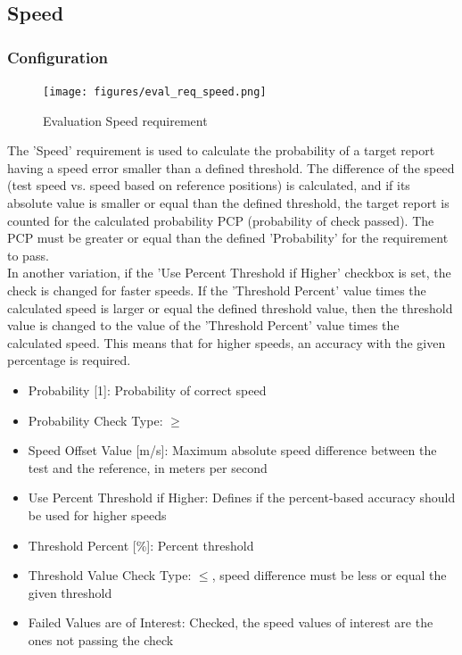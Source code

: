 \subsection{Speed}
\label{sec:eval_req_speed} 

\subsubsection{Configuration}

\begin{figure}[H]
    \texttt{[image: figures/eval\_req\_speed.png]}
  \caption{Evaluation Speed requirement}
\end{figure}

The 'Speed' requirement is used to calculate the probability of a target report having a speed error smaller than a defined threshold. The difference of the speed (test speed vs. speed based on reference positions) is calculated, and if its absolute value is smaller or equal than the defined threshold, the target report is counted for the calculated probability PCP (probability of check passed). The PCP must be greater or equal than the defined 'Probability' for the requirement to pass. \\

In another variation, if the 'Use Percent Threshold if Higher' checkbox is set, the check is changed for faster speeds. If the 'Threshold Percent' value times the calculated speed is larger or equal the defined threshold value, then the threshold value is changed to the value of the 'Threshold Percent' value times the calculated speed. This means that for higher speeds, an accuracy with the given percentage is required. \\

\begin{itemize}  
\item Probability [1]: Probability of correct speed
\item Probability Check Type: $\geq$
\item Speed Offset Value [m/s]: Maximum absolute speed difference between the test and the reference, in meters per second
\item Use Percent Threshold if Higher: Defines if the percent-based accuracy should be used for higher speeds
\item Threshold Percent [\%]: Percent threshold
\item Threshold Value Check Type: $\leq$, speed difference must be less or equal the given threshold
\item Failed Values are of Interest: Checked, the speed values of interest are the ones not passing the check
\end{itemize}
\ \\

